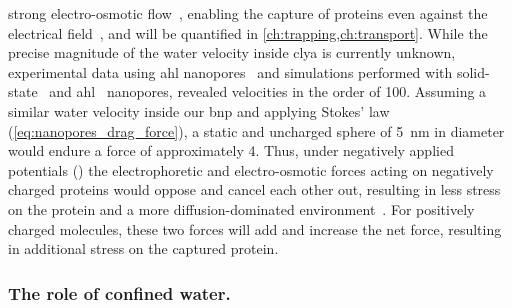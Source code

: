 strong electro-osmotic flow~\cite{Franceschini-2016}, enabling the capture of proteins even against the
electrical field~\cite{Soskine-2012}, and will be quantified in \cref{ch:trapping,ch:transport}. While the
precise magnitude of the water velocity inside \gls{clya} is currently unknown, experimental data using
\gls{ahl} nanopores~\cite{Paula-1999} and simulations performed with solid-state~\cite{vanDorp-2009,Luan-2008}
and \gls{ahl}~\cite{Aksimentiev-2005,Pederson-2015} nanopores, revealed velocities in the order of
\SI{100}{\mmps}. Assuming a similar water velocity inside our \gls{bnp} and applying Stokes’ law
(\cref{eq:nanopores_drag_force}), a static and uncharged sphere of \SI{5}{\nm} in diameter would endure a
force of approximately \SI{4}{\pN}. Thus, under negatively applied potentials (\transi{}) the electrophoretic
and electro-osmotic forces acting on negatively charged proteins would oppose and cancel each other out,
resulting in less stress on the protein and a more diffusion-dominated environment~\cite{Firnkes-2010}. For
positively charged molecules, these two forces will add and increase the net force, resulting in additional
stress on the captured protein.

\subsubsection{The role of confined water.}
%

